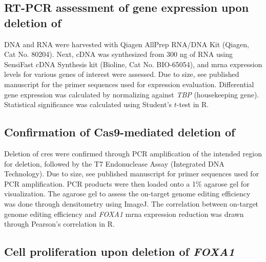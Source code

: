 \subsection{RT-PCR assessment of gene expression upon deletion of }

DNA and RNA were harvested with Qiagen AllPrep RNA/DNA Kit (Qiagen, Cat No. 80204).
Next, cDNA was synthesized from 300 ng of RNA using SensiFast cDNA Synthesis kit (Bioline, Cat No. BIO-65054), and \gls{mrna} expression levels for various genes of interest were assessed.
Due to size, see published manuscript for the primer sequences used for expression evaluation.
Differential gene expression was calculated by normalizing against \emph{TBP} (housekeeping gene).
Statistical significance was calculated using Student's $t$-test in R.

\subsection{Confirmation of Cas9-mediated deletion of }

Deletion of \glspl{cre} were confirmed through PCR amplification of the intended region for deletion, followed by the T7 Endonuclease Assay (Integrated DNA Technology).
Due to size, see published manuscript for primer sequences used for PCR amplification.
PCR products were then loaded onto a 1\% agarose gel for visualization.
The agarose gel to assess the on-target genome editing efficiency was done through densitometry using ImageJ.
The correlation between on-target genome editing efficiency and \emph{FOXA1} \gls{mrna} expression reduction was drawn through Pearson's correlation in R.

\subsection{Cell proliferation upon deletion of \emph{FOXA1} }

